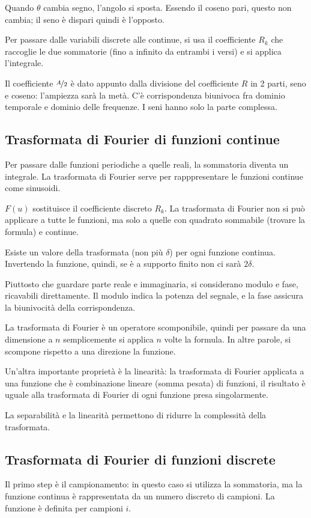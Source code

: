 Quando $\theta$ cambia segno, l'angolo si sposta. Essendo il coseno pari, questo non cambia; il seno è dispari quindi è l'opposto. 

Per passare dalle variabili discrete alle continue, si usa il coefficiente $R_k$ che raccoglie le due sommatorie (fino a infinito da entrambi i versi) e si applica l'integrale. 

Il coefficiente $\nicefrac{A}{2}$ è dato appunto dalla divisione del coefficiente $R$ in 2 parti, seno e coseno: l'ampiezza sarà la metà. C'è corrispondenza biunivoca fra dominio temporale e dominio delle frequenze. I seni hanno solo la parte complessa.

\subsection{Trasformata di Fourier di funzioni continue}
Per passare dalle funzioni periodiche a quelle reali, la sommatoria diventa un integrale. La trasformata di Fourier serve per rapppresentare le funzioni continue come sinusoidi.


$F(u)$ sostituisce il coefficiente discreto $R_k$. La trasformata di Fourier non si può applicare a tutte le funzioni, ma solo a quelle con quadrato sommabile (trovare la formula) e continue.

Esiste un valore della trasformata (non più $\delta$) per ogni funzione continua. Invertendo la funzione, quindi, se è a supporto finito non ci sarà $2\delta$.

Piuttosto che guardare parte reale e immaginaria, si considerano modulo e fase, ricavabili direttamente. Il modulo indica la potenza del segnale, e la fase assicura la biunivocità della corrispondenza. %

La trasformata di Fourier è un operatore scomponibile, quindi per passare da una dimensione a $n$ semplicemente si applica $n$ volte la formula. In altre parole, si scompone rispetto a una direzione la funzione.

Un'altra importante proprietà è la linearità: la trasformata di Fourier applicata a una funzione che è combinazione lineare (somma pesata) di funzioni, il risultato è uguale alla trasformata di Fourier di ogni funzione presa singolarmente. 

La separabilità e la linearità permettono di ridurre la complessità della trasformata.

\subsection{Trasformata di Fourier di funzioni discrete}
Il primo step è il campionamento: in questo caso si utilizza la sommatoria, ma la funzione continua è rappresentata da un numero discreto di campioni. La funzione è definita per campioni $i$.

